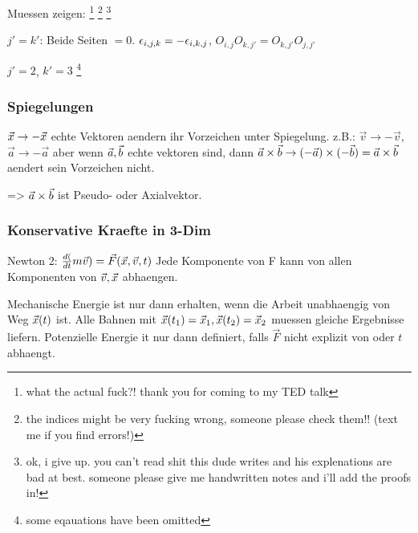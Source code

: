 Muessen zeigen: \footnote{what the actual fuck?! thank you for coming to my TED talk}
\footnote{the indices might be very fucking wrong, someone please check them!! (text me if you find errors!)}
\footnote{ok, i give up. you can't read shit this dude writes and his explenations are bad at best. someone please give me handwritten notes and i'll add the proofs in!}

$j' = k'$: Beide Seiten $=0$. $\epsilon_{i, j, k} = - \epsilon_{i, k, j}$, $O_{i, j} O_{k, j'} = O_{k, j'} O_{j, j'}$

$j' = 2$, $k' = 3$ \footnote{some eqauations have been omitted}



\subsubsection{Spiegelungen}
$\vec{x} \rightarrow - \vec{x}$ echte Vektoren aendern ihr Vorzeichen unter Spiegelung. 
z.B.: $\vec{v} \rightarrow - \vec{v}$, $\vec{a} \rightarrow - \vec{a}$ aber wenn $\vec{a}, \vec{b}$ echte vektoren sind, dann $\vec{a} \times \vec{b} \rightarrow (-\vec{a})\times (- \vec{b}) = \vec{a} \times \vec{b}$ aendert sein Vorzeichen nicht.

=> $\vec{a} \times \vec{b}$ ist Pseudo- oder Axialvektor.

\subsubsection{Konservative Kraefte in 3-Dim}
Newton 2: ${d (\over dt}m \vec{v}) = \vec{F}(\vec{x}, \vec{v}, t)$ 
Jede Komponente von F kann von allen Komponenten von $\vec{v}, \vec{x}$ abhaengen.



Mechanische Energie ist nur dann erhalten, wenn die Arbeit unabhaengig von Weg $\vec{x}(t)$ ist. 
Alle Bahnen mit $\vec{x}(t_1) = \vec{x}_1, \vec{x}(t_2) = \vec{x}_2$ muessen gleiche Ergebnisse liefern.
Potenzielle Energie it nur dann definiert, falls $\vec{F}$ nicht explizit von oder $t$ abhaengt.

